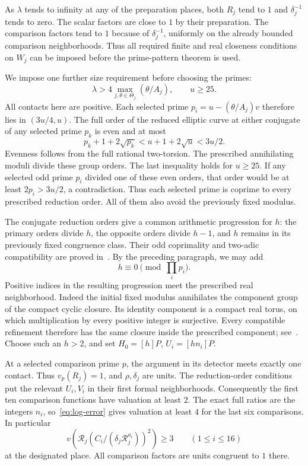 \documentclass[11pt,a4paper]{article}
\begin{document}
As $\lambda$ tends to infinity at any of the preparation places, both
$R_j$ tend to $1$ and $\delta_j^{-1}$ tends to zero. The scalar
factors are close to $1$ by their preparation. The comparison
factors tend to $1$ because of $\delta_j^{-1}$, uniformly on
the already bounded comparison neighborhoods. Thus all required
finite and real closeness conditions on $W_j$ can be imposed
before the prime-pattern theorem is used.

We impose one further size requirement before choosing the primes:
\begin{equation}\label{eq:prime-cluster}
 \lambda>4\max_{j,\theta\in\Theta_j}(\theta/A_j),\qquad u\ge25.
\end{equation}
All contacts here are positive. Each selected prime
$p_i=u-(\theta/A_j)v$ therefore lies in $(3u/4,u)$. The full
order of the reduced elliptic curve at either conjugate of any selected prime
$p_k$ is even and at most
\[
 p_k+1+2\sqrt{p_k}<u+1+2\sqrt u<3u/2.
\]
Evenness follows from the full rational two-torsion. The prescribed
annihilating moduli divide these group orders. The last inequality holds for $u\ge25$.
If any selected odd prime $p_i$ divided one of these even orders,
that order would be at least $2p_i>3u/2$, a contradiction.
Thus each selected prime is coprime to every prescribed reduction
order. All of them also avoid the previously fixed modulus.

The conjugate reduction orders give a common arithmetic progression
for $h$: the primary orders divide $h$, the opposite orders divide
$h-1$, and $h$ remains in its previously fixed congruence class.
Their odd coprimality and two-adic compatibility are proved
in~\cite{Dependencies}. By the preceding paragraph, we may add
\begin{equation}\label{eq:extra-divisibility}
                         h\equiv0\pmod{\prod_i p_i}.
\end{equation}
Positive indices in the resulting progression meet the prescribed
real neighborhood. Indeed the initial fixed modulus annihilates the component group
of the compact cyclic closure. Its identity component is a compact
real torus, on which multiplication by every positive integer is
surjective. Every compatible refinement therefore has the same
closure inside the prescribed component; see~\cite{Dependencies}.
Choose such an $h>2$, and set $H_0=[h]P$, $U_i=[hn_i]P$.

At a selected comparison prime $p$, the argument in its detector
meets exactly one contact. Thus $v_p(R_j)=1$, and $\rho,\delta_j$
are units. The reduction-order conditions put the relevant $U_i,V_i$
in their first formal neighborhoods. Consequently the first ten
comparison functions have valuation at least $2$. The exact full
ratios are the integers $n_i$, so~\eqref{eq:log-error} gives
valuation at least $4$ for the last six comparisons. In particular
\[
 v\left(\mathcal R_j
       (C_i/(\delta_j\mathcal R_j^{a_i}))^2\right)\ge3
                         \qquad(1\le i\le16)
\]
at the designated place. All comparison factors are units congruent
to $1$ there.
\end{document}
